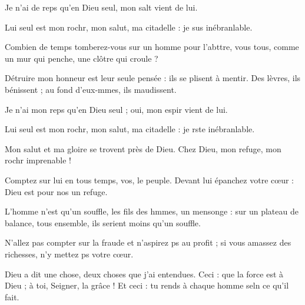 \item Je n’ai de reps qu’en Dieu seul, mon salt vient de lui.
\item Lui seul est mon rochr, mon salut, ma citadelle : je sus inébranlable.
\item Combien de temps tomberez-vous sur un homme pour l’abttre, vous tous, comme un mur qui penche, une clôtre qui croule ?
\item Détruire mon honneur est leur seule pensée : ils se plisent à mentir. Des lèvres, ils bénissent ; au fond d’eux-mmes, ils maudissent.
\item Je n’ai mon reps qu’en Dieu seul ; oui, mon espir vient de lui.
\item Lui seul est mon rochr, mon salut, ma citadelle : je rste inébranlable.
\item Mon salut et ma gloire se trovent près de Dieu. Chez Dieu, mon refuge, mon rochr imprenable !
\item Comptez sur lui en tous temps, vos, le peuple. Devant lui épanchez votre cœur : Dieu est pour nos un refuge.
\item L’homme n’est qu’un souffle, les fils des hmmes, un mensonge : sur un plateau de balance, tous ensemble, ils serient moins qu’un souffle.
\item N’allez pas compter sur la fraude et n’aspirez ps au profit ; si vous amassez des richesses, n’y mettez ps votre cœur.
\item Dieu a dit une chose, deux choses que j’ai entendues. Ceci : que la force est à Dieu ; à toi, Seigner, la grâce ! Et ceci : tu rends à chaque homme seln ce qu’il fait.